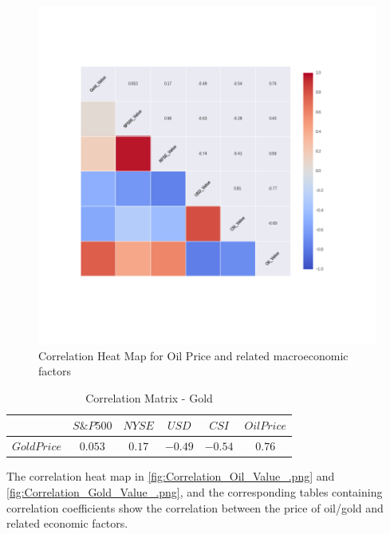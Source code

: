 \documentclass[runningheads]{llncs}
\begin{document}
\begin{figure}
\centering
\includegraphics[width=\textwidth]{Correlation_Gold_Value_.png}
\caption{Correlation Heat Map for Oil Price and related macroeconomic factors}
\label{fig:Correlation_Gold_Value_.png}
\end{figure}

\begin{table}
\begin{center}
\begin{tabular}{|c|c|c|c|c|c|}
\hline
$ $ & $ S\&P 500 $ & $ NYSE $ & $ USD $  & $CSI$ &$Oil Price$ \\  \hline
$Gold Price$ & $0.053$ & $0.17$ & $-0.49$ & $-0.54$ & $0.76$ \\ \hline
\end{tabular}
\end{center}
\caption{Correlation Matrix - Gold}
\end{table}

\newpage
\noindent The correlation heat map in \autoref{fig:Correlation_Oil_Value_.png} and \autoref{fig:Correlation_Gold_Value_.png}, and the corresponding tables containing correlation coefficients show the correlation between the price of oil/gold and related economic factors. \\
\end{document}
